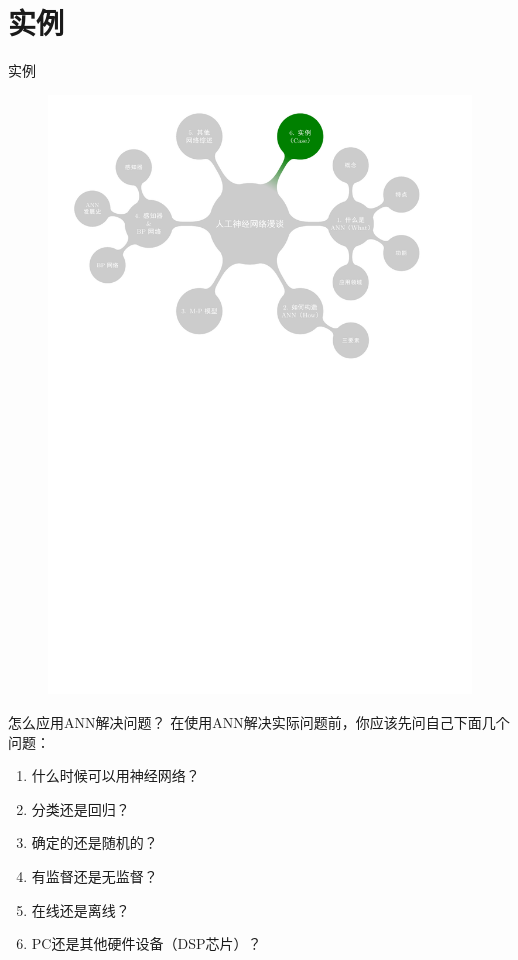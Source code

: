 \documentclass[xcolor=svgnames]{beamer}
\begin{document}
\section{实例}
\label{sec:case}

\begin{frame}{实例}
    \vspace{-1em}
  \begin{figure}
    \centering
    \includegraphics[width=\textwidth]{mindmap/map7.pdf}
  \end{figure}
\end{frame}

\begin{frame}{怎么应用ANN解决问题？}
  在使用ANN解决实际问题前，你应该先问自己下面几个问题：
  \begin{enumerate}
  \item 什么时候可以用神经网络？
  \item 分类还是回归？
  \item 确定的还是随机的？
  \item 有监督还是无监督？
  \item 在线还是离线？
  \item PC还是其他硬件设备（DSP芯片）？
  \end{enumerate}
\end{frame}
  
\end{document}

